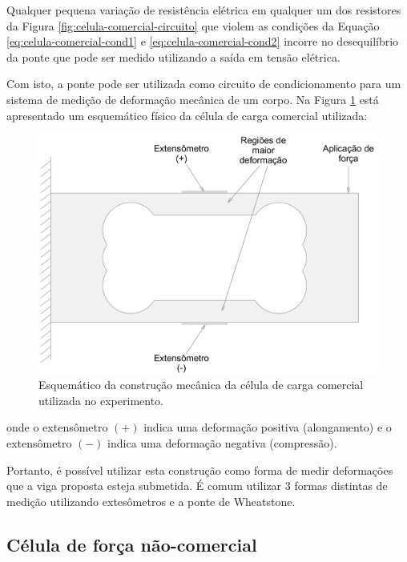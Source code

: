 \documentclass[a4paper]{instrumentacao}
\begin{document}
Qualquer pequena variação de resistência elétrica em qualquer um dos resistores da Figura \ref{fig:celula-comercial-circuito} que violem as condições da Equação \ref{eq:celula-comercial-cond1} e \ref{eq:celula-comercial-cond2} incorre no desequilíbrio da ponte que pode ser medido utilizando a saída em tensão elétrica.

Com isto, a ponte pode ser utilizada como circuito de condicionamento para um sistema de medição de deformação mecânica de um corpo. Na Figura \ref{fig:celula-comercial-esquema-fisico} está apresentado um esquemático físico da célula de carga comercial utilizada:

\begin{figure}[H]
\center
\includegraphics[width=\textwidth]{CelulaComercial.pdf}
\caption{Esquemático da construção mecânica da célula de carga comercial utilizada no experimento.}
\label{fig:celula-comercial-esquema-fisico}
\end{figure}

\noindent onde o extensômetro $(+)$ indica uma deformação positiva (alongamento) e o extensômetro $(-)$ indica uma deformação negativa (compressão).

Portanto, é possível utilizar esta construção como forma de medir deformações que a viga proposta esteja submetida. É comum utilizar 3 formas distintas de medição utilizando extesômetros e a ponte de Wheatstone.


\subsection{Célula de força não-comercial}
\end{document}
